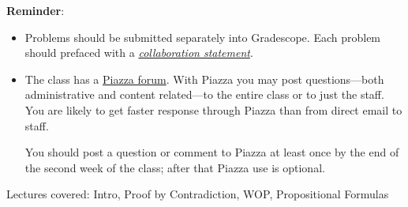 \documentclass[handout]{mcs}
\begin{document}
\renewcommand{\reading}{
\begin{itemize}
\item Chapter~\bref{proofs_chap}{.\ \emph{What is a Proof?}},

\item  Chapter~\bref{well_ordering_chap}{.\ \emph{The Well Ordering
      Principle}} through~\bref{factor_sec}{;}
  (omit~\bref{well_ordering_sec}{.\ \emph{Well Ordered Sets}}),

\item Chapter~\bref{logicform_chap}{.\ \emph{Logical Formulas}}
  through~\bref{equiv_valid_sec}.

\end{itemize}
These assigned readings do \textbf{not}
  include the Problem sections.  (Many of the problems in the text
  will appear as class or homework problems.)}


\medskip

\textbf{Reminder}:

\begin{itemize}

\item Problems should be submitted separately into Gradescope.  Each
  problem should prefaced with a
  \href{http://courses.csail.mit.edu/6.042/spring17/pset_instructions.shtml#collab-state}
       {\emph{collaboration statement}}.

\item The class has a
  \href{http://piazza.com/mit/spring2017/6042j18062j/home} {Piazza
    forum}.  With Piazza you may post questions---both administrative
  and content related---to the entire class or to just the staff.  You
  are likely to get faster response through Piazza than from direct
  email to staff.

  You should post a question or comment to Piazza at least once by the
  end of the second week of the class; after that Piazza use is
  optional.
\end{itemize}

\begin{staffnotes}
Lectures covered: Intro, Proof by Contradiction, WOP, Propositional Formulas
\end{staffnotes}



\end{document}
